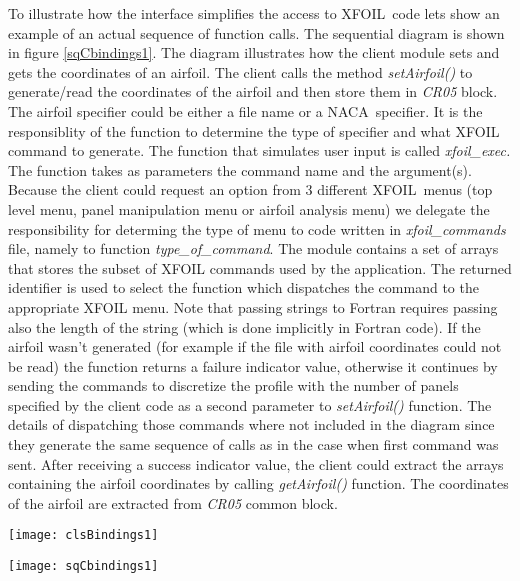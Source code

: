 To illustrate how the interface simplifies the access to XFOIL\ code lets
show an example of an actual sequence of function calls. The sequential
diagram is shown in figure \ref{sqCbindings1}. The diagram illustrates how the client module sets and gets the
coordinates of an airfoil. The client calls the method \textit{setAirfoil()}
to generate/read the coordinates of the airfoil and then store them in 
\textit{CR05} block. The airfoil specifier could be either a file name or a
NACA\ specifier. It is the responsiblity of the function to determine the
type of specifier and what XFOIL command to generate. The function that
simulates user input is called \textit{xfoil\_exec.} The function takes as
parameters the command name and the argument(s). Because the client could
request an option from 3 different XFOIL\ menus (top level menu, panel
manipulation menu or airfoil analysis menu) we delegate the responsibility
for determing the type of menu to code written in \textit{xfoil\_commands}
file, namely to function \textit{type\_of\_command}. The module contains a
set of arrays that stores the subset of XFOIL commands used by the
application. The returned identifier is used to select the function which
dispatches the command to the appropriate XFOIL menu. Note that passing
strings to Fortran requires passing also the length of the string (which is
done implicitly in Fortran code). If the airfoil wasn't generated (for
example if the file with airfoil coordinates could not be read) the function
returns a failure indicator value, otherwise it continues by sending the
commands to discretize the profile with the number of panels specified by
the client code as a second parameter to \textit{setAirfoil()} function. The
details of dispatching those commands where not included in the diagram
since they generate the same sequence of calls as in the case when first
command was sent. After receiving a success indicator value, the client
could extract the arrays containing the airfoil coordinates by calling 
\textit{getAirfoil()} function. The coordinates of the airfoil are extracted
from \textit{CR05} common block.

\begin{sidewaysfigure}[!ht]
\centering
\texttt{[image: clsBindings1]}
\caption{C++ language bindings -- static view}\label{clsBindings1}
\end{sidewaysfigure}

\clearpage

\begin{sidewaysfigure}[!ht]
\centering
\texttt{[image: sqCbindings1]}
\caption{Setting and extracting airfoil coordinates}\label{sqCbindings1}
\end{sidewaysfigure}

\clearpage